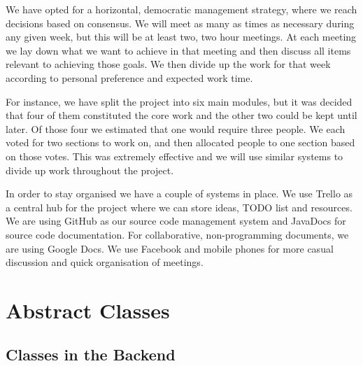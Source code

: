 \documentclass[12pt,a4paper]{report}
\begin{document}
We have opted for a horizontal, democratic management strategy, where we reach decisions based on consensus. We will meet as many as times as necessary during any given week, but this will be at least two, two hour meetings. At each meeting we lay down what we want to achieve in that meeting and then discuss all items relevant to achieving those goals. We then divide up the work for that week according to personal preference and expected work time.

For instance, we have split the project into six main modules, but it was decided that four of them constituted the core work and the other two could be kept until later. Of those four we estimated that one would require three people. We each voted for two sections to work on, and then allocated people to one section based on those votes. This was extremely effective and we will use similar systems to divide up work throughout the project.

In order to stay organised we have a couple of systems in place. We use Trello as a central hub for the project where we can store ideas, TODO list and resources. We are using GitHub as our source code management system and JavaDocs for source code documentation. For collaborative, non-programming documents, we are using Google Docs. We use Facebook and mobile phones for more casual discussion and quick organisation of meetings.

\chapter{Abstract Classes}

\section{Classes in the Backend}
\end{document}
